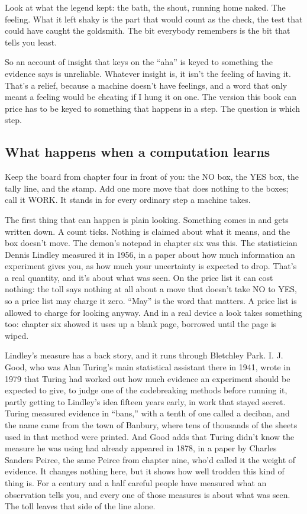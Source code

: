 \documentclass[11pt,twoside]{article}
\theoremstyle{thielethm}
\theoremstyle{thieledef}
\theoremstyle{thieledef}
\theoremstyle{thieledef}
\theoremstyle{thielethm}
\theoremstyle{thieleobs}
\theoremstyle{thielethm}
\begin{document}
Look at what the legend kept: the bath, the shout, running home naked. The feeling. What it left shaky is the part that would count as the check, the test that could have caught the goldsmith. The bit everybody remembers is the bit that tells you least.

So an account of insight that keys on the ``aha'' is keyed to something the evidence says is unreliable. Whatever insight is, it isn't the feeling of having it. That's a relief, because a machine doesn't have feelings, and a word that only meant a feeling would be cheating if I hung it on one. The version this book can price has to be keyed to something that happens in a step. The question is which step.

\subsection{What happens when a computation learns}

Keep the board from chapter four in front of you: the NO box, the YES box, the tally line, and the stamp. Add one more move that does nothing to the boxes; call it WORK. It stands in for every ordinary step a machine takes.

The first thing that can happen is plain looking. Something comes in and gets written down. A count ticks. Nothing is claimed about what it means, and the box doesn't move. The demon's notepad in chapter six was this. The statistician Dennis Lindley measured it in 1956, in a paper about how much information an experiment gives you, as how much your uncertainty is expected to drop. That's a real quantity, and it's about what was seen. On the price list it can cost nothing: the toll says nothing at all about a move that doesn't take NO to YES, so a price list may charge it zero. ``May'' is the word that matters. A price list is allowed to charge for looking anyway. And in a real device a look takes something too: chapter six showed it uses up a blank page, borrowed until the page is wiped.

Lindley's measure has a back story, and it runs through Bletchley Park. I. J. Good, who was Alan Turing's main statistical assistant there in 1941, wrote in 1979 that Turing had worked out how much evidence an experiment should be expected to give, to judge one of the codebreaking methods before running it, partly getting to Lindley's idea fifteen years early, in work that stayed secret. Turing measured evidence in ``bans,'' with a tenth of one called a deciban, and the name came from the town of Banbury, where tens of thousands of the sheets used in that method were printed. And Good adds that Turing didn't know the measure he was using had already appeared in 1878, in a paper by Charles Sanders Peirce, the same Peirce from chapter nine, who'd called it the weight of evidence. It changes nothing here, but it shows how well trodden this kind of thing is. For a century and a half careful people have measured what an observation tells you, and every one of those measures is about what was seen. The toll leaves that side of the line alone.
\end{document}
